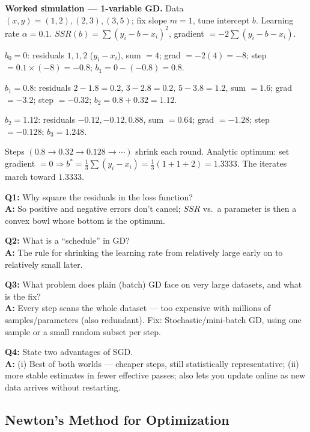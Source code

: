 \begin{examplebox}
\textbf{Worked simulation — 1-variable GD.} Data $(x,y)=(1,2),(2,3),(3,5)$; fix slope $m=1$, tune intercept $b$. Learning rate $\alpha=0.1$. $SSR(b)=\sum(y_i-b-x_i)^2$, gradient $=-2\sum(y_i-b-x_i)$.

$b_0=0$: residuals $1,1,2$ ($y_i-x_i$), sum $=4$; grad $=-2(4)=-8$; step $=0.1\times(-8)=-0.8$; $b_1 = 0-(-0.8)=0.8$.

$b_1=0.8$: residuals $2-1.8=0.2,\,3-2.8=0.2,\,5-3.8=1.2$, sum $=1.6$; grad $=-3.2$; step $=-0.32$; $b_2=0.8+0.32=1.12$.

$b_2=1.12$: residuals $-0.12,-0.12,0.88$, sum $=0.64$; grad $=-1.28$; step $=-0.128$; $b_3=1.248$.

Steps $(0.8\to0.32\to0.128\to\cdots)$ shrink each round. Analytic optimum: set gradient $=0\Rightarrow b^\ast=\frac{1}{3}\sum(y_i-x_i)=\frac{1}{3}(1+1+2)=1.3333$. The iterates march toward $1.3333$.
\end{examplebox}

\begin{qabox}
\textbf{Q1:} Why square the residuals in the loss function? \\
\textbf{A:} So positive and negative errors don't cancel; $SSR$ vs.\ a parameter is then a convex bowl whose bottom is the optimum.

\textbf{Q2:} What is a ``schedule'' in GD? \\
\textbf{A:} The rule for shrinking the learning rate from relatively large early on to relatively small later.

\textbf{Q3:} What problem does plain (batch) GD face on very large datasets, and what is the fix? \\
\textbf{A:} Every step scans the whole dataset — too expensive with millions of samples/parameters (also redundant). Fix: Stochastic/mini-batch GD, using one sample or a small random subset per step.

\textbf{Q4:} State two advantages of SGD. \\
\textbf{A:} (i) Best of both worlds — cheaper steps, still statistically representative; (ii) more stable estimates in fewer effective passes; also lets you update online as new data arrives without restarting.
\end{qabox}

\subsection{Newton's Method for Optimization}

